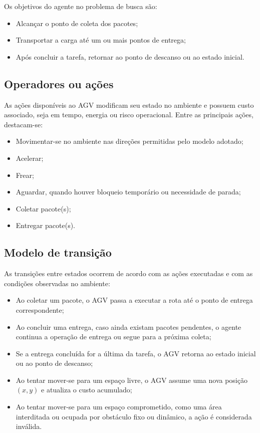 \documentclass[12pt,a4paper]{article}
\begin{document}
Os objetivos do agente no problema de busca são:

\begin{itemize}
    \item Alcançar o ponto de coleta dos pacotes;
    \item Transportar a carga até um ou mais pontos de entrega;
    \item Após concluir a tarefa, retornar ao ponto de descanso ou ao estado inicial.
\end{itemize}

\subsection{Operadores ou ações}

As ações disponíveis ao \ac{AGV} modificam seu estado no ambiente e possuem custo associado, seja em tempo, energia ou risco operacional. Entre as principais ações, destacam-se:

\begin{itemize}
    \item Movimentar-se no ambiente nas direções permitidas pelo modelo adotado;
    \item Acelerar;
    \item Frear;
    \item Aguardar, quando houver bloqueio temporário ou necessidade de parada;
    \item Coletar pacote(s);
    \item Entregar pacote(s).
\end{itemize}

\subsection{Modelo de transição}

As transições entre estados ocorrem de acordo com as ações executadas e com as condições observadas no ambiente:

\begin{itemize}
    \item Ao coletar um pacote, o \ac{AGV} passa a executar a rota até o ponto de entrega correspondente;
    \item Ao concluir uma entrega, caso ainda existam pacotes pendentes, o agente continua a operação de entrega ou segue para a próxima coleta;
    \item Se a entrega concluída for a última da tarefa, o \ac{AGV} retorna ao estado inicial ou ao ponto de descanso;
    \item Ao tentar mover-se para um espaço livre, o \ac{AGV} assume uma nova posição $(x, y)$ e atualiza o custo acumulado;
    \item Ao tentar mover-se para um espaço comprometido, como uma área interditada ou ocupada por obstáculo fixo ou dinâmico, a ação é considerada inválida.
\end{itemize}
\end{document}
